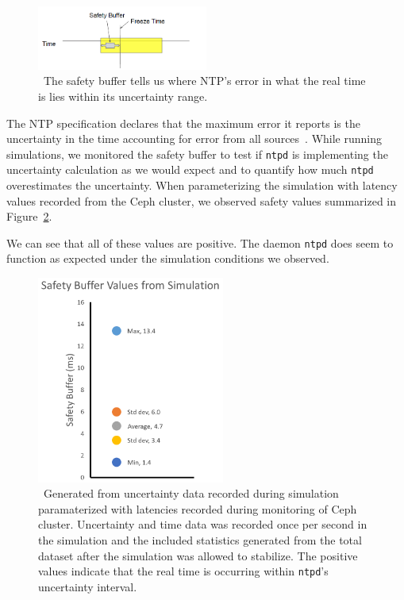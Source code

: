 \begin{figure}[!htbp]
  \caption{~The safety buffer tells us where NTP's error in what the real time is lies within its uncertainty range.} 
  \label{fig:safety-diag}
  \centering
  \includegraphics[width=0.5\textwidth]{safety-diagram.png}
\end{figure}

The NTP specification declares that the maximum error it reports is
the uncertainty in the time accounting for error from all
sources~\citep{Burbank2010}.  While running simulations, we monitored
the safety buffer to test if \texttt{ntpd} is implementing the
uncertainty calculation as we would expect and to quantify how much
\texttt{ntpd} overestimates the uncertainty.  When parameterizing the
simulation with latency values recorded from the Ceph cluster, we
observed safety values summarized in Figure~\ref{fig:safety-data}.

We can see that all of these values are positive. The daemon
\texttt{ntpd} does seem to function as expected under the simulation
conditions we observed.

\begin{figure}[!htbp]
  \caption{~Generated from uncertainty data recorded during simulation paramaterized
  with latencies recorded during monitoring of Ceph cluster. Uncertainty and time
  data was recorded once per second in the simulation and the included statistics 
  generated from the total dataset after the simulation was allowed to stabilize. 
  The positive values indicate that the real time is occurring within \texttt{ntpd}'s 
  uncertainty interval.}
  \label{fig:safety-data}
  \centering
  \includegraphics[width=0.55\textwidth]{5pointsSafety.png}
\end{figure}

